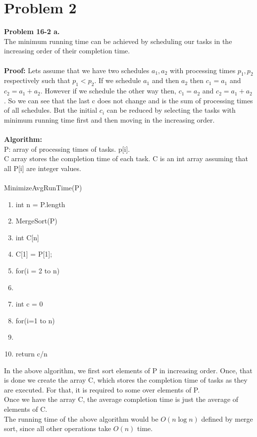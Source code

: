 \documentclass[10pt]{article}
\newcommand{\tab}[1]{\hspace{.05\textwidth}\rlap{#1}}
\begin{document}
\section{Problem 2}
\textbf{Problem 16-2 a.}\\
The minimum running time can be achieved by scheduling our tasks in the increasing order of their completion time.\\\\
\textbf{Proof: }Lets assume that we have two schedules $a_1, a_2$ with processing times $p_1, p_2$ respectively such that $p_1 < p_2$. If we schedule $a_1$ and then $a_2$ then $c_1 = a_1$ and $c_2 = a_1 + a_2$. However if we schedule the other way then, $c_1 = a_2$ and $c_2 = a_1 + a_2$. So we can see that the last c does not change and is the sum of processing times of all schedules. But the initial $c_i$ can be reduced by selecting the tasks with minimum running time first and then moving in the increasing order.\\\\
\textbf{Algorithm:}\\
P: array of processing times of tasks. p[i].\\
C array stores the completion time of each task. C is an int array assuming that all P[i] are integer values.\\\\
MinimizeAvgRunTime(P)
\begin{enumerate}
\item int n = P.length
\item MergeSort(P)
\item int C[n]
\item C[1] = P[1];
\item for(i = 2 to n)
\item \tab{C[i] = C[i-1] + P[i]}
\item int c = 0
\item for(i=1 to n)
\item \tab{c = c + C[i]}
\item return c/n
\end{enumerate}
In the above algorithm, we first sort elements of P in increasing order. Once, that is done we create the array C, which stores the completion time of tasks as they are executed. For that, it is required to some over elements of P.\\
Once we have the array C, the average completion time is just the average of elements of C.\\
The running time of the above algorithm would be $O(n \log n)$ defined by merge sort, since all other operations take $O(n)$ time.\\\\\\
\end{document}
